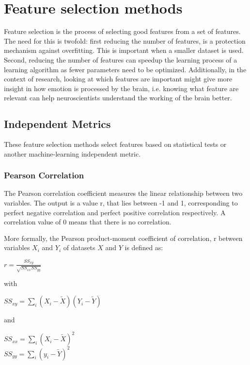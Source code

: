 \section{Feature selection methods}
Feature selection is the process of selecting good features from a set of features. The need for this is twofold: first reducing the number of features, is a protection mechanism against overfitting. This is important when a smaller dataset is used. Second, reducing the number of features can speedup the learning process of a learning algorithm as fewer parameters need to be optimized. Additionally, in the context of research, looking at which features are important might give more insight in how emotion is processed by the brain, i.e. knowing what feature are relevant can help neuroscientists understand the working of the brain better.

\subsection{Independent Metrics}
These feature selection methods select features based on statistical tests or another machine-learning independent metric. 

\subsubsection{Pearson Correlation}
The Pearson correlation coefficient measures the linear relationship between two variables. The output is a value r, that lies between -1 and 1, corresponding to perfect negative correlation and perfect positive correlation respectively. A correlation value of 0 means that there is no correlation.

\npar

More formally\citep{corrPaper}, the Pearson product-moment coefficient of correlation, r between variables $X_i$ and $Y_i$ of datasets $X$ and $Y$ is defined as:

\begin{center}
$r = \frac{SS_{xy}}{\sqrt{SS_{xx}SS_{yy}}}$
\end{center}
with
\begin{center}
$SS_{xy} = \sum\limits_i (X_i-\tilde{X})(Y_i-\tilde{Y})$
\end{center}
and
\begin{center}
$SS_{xx} = \sum\limits_i (X_i-\tilde{X})^2$ \\
$SS_{yy} = \sum\limits_i (y_i-\tilde{Y})^2$
\end{center}

